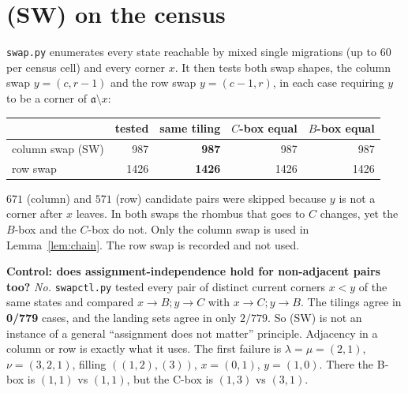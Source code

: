 \documentclass[11pt]{article}
\theoremstyle{definition}
\newcommand{\toB}{\!\to\! B}
\newcommand{\toC}{\!\to\! C}
\newcommand{\fa}{\mathfrak a}
\begin{document}
\section{(SW) on the census}\label{sec:sw}
\texttt{swap.py} enumerates every state reachable by mixed single migrations (up to 60 per census cell) and every corner $x$. It
then tests both swap shapes, the column swap $y=(c,r-1)$ and the row swap $y=(c-1,r)$, in each case requiring $y$ to be a corner of $\fa\setminus x$:
\begin{center}\begin{tabular}{lrrrr}\toprule
& tested & same tiling & $C$-box equal & $B$-box equal\\\midrule
column swap (SW) & 987 & \textbf{987} & 987 & 987\\
row swap & 1426 & \textbf{1426} & 1426 & 1426\\\bottomrule
\end{tabular}\end{center}
$671$ (column) and $571$ (row) candidate pairs were skipped because $y$ is not a corner after $x$ leaves. In both swaps the
rhombus that goes to $C$ changes, yet the $B$-box and the $C$-box do not. Only the column swap is used in Lemma~\ref{lem:chain}.
The row swap is recorded and not used.

\textbf{Control: does assignment-independence hold for non-adjacent pairs too?} \emph{No.} \texttt{swapctl.py} tested every pair of distinct current corners $x<y$ of the same states and compared $x\toB;y\toC$ with $x\toC;y\toB$. The tilings agree in
\textbf{0/779} cases, and the landing sets agree in only $2/779$. So (SW) is not an instance of a general ``assignment does not matter''
principle. Adjacency in a column or row is exactly what it uses. The first failure is $\lambda=\mu=(2,1)$, $\nu=(3,2,1)$, filling $((1,2),(3))$,
$x=(0,1)$, $y=(1,0)$. There the B-box is $(1,1)$ vs $(1,1)$, but the C-box is $(1,3)$ vs $(3,1)$.
\end{document}

